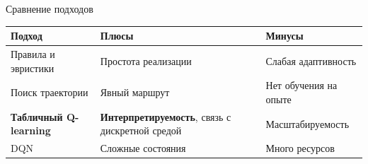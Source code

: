 \documentclass[aspectratio=169,12pt]{beamer}
\newcommand{\accenttag}[1]{%
  \tikz[baseline=(t.base)]{\node[fill=accentlight,rounded corners=3pt,inner sep=4pt](t){\textcolor{accent}{\small\bfseries #1}};}%
}
\begin{document}
\begin{frame}[t,shrink=10]{Сравнение подходов}

\centering
\renewcommand{\arraystretch}{1.25}
\begin{tabularx}{0.94\textwidth}{>{\raggedright\arraybackslash}p{} >{\raggedright\arraybackslash}p{} X}
    \arrayrulecolor{ruleclr}
    \toprule
    \textcolor{textsub}{\small Подход} & \textcolor{textsub}{\small Плюсы} & \textcolor{textsub}{\small Минусы} \\
    \midrule
    Правила и эвристики & Простота реализации & Слабая адаптивность \\
    Поиск траектории & Явный маршрут & Нет обучения на опыте \\
    \rowcolor{accentlight} \textcolor{accent}{\textbf{Табличный Q-learning}} & \textbf{Интерпретируемость}, связь с дискретной средой & Масштабируемость \\
    DQN & Сложные состояния & Много ресурсов \\
    \bottomrule
\end{tabularx}
\renewcommand{\arraystretch}{1.0}

\vspace{0.3cm}
\accenttag{Выбран табличный Q-learning} 
\end{frame}
\end{document}
